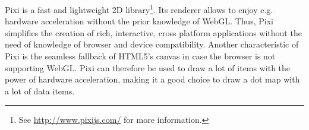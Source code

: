 \ac{Pixi} is a fast and lightweight 2D library\footnote{See \href{http://www.pixijs.com/}{http://www.pixijs.com/} for more information.}. Its renderer allows to enjoy e.g. hardware acceleration without the prior knowledge of \ac{WebGL}. Thus, \ac{Pixi} simplifies the creation of rich, interactive, cross platform applications without the need of knowledge of browser and device compatibility. Another characteristic of \ac{Pixi} is the seamless fallback of HTML5's canvas in case the browser is not supporting \ac{WebGL}.
\ac{Pixi} can therefore be used to draw a lot of items with the power of hardware acceleration, making it a good choice to draw a dot map with a lot of data items.